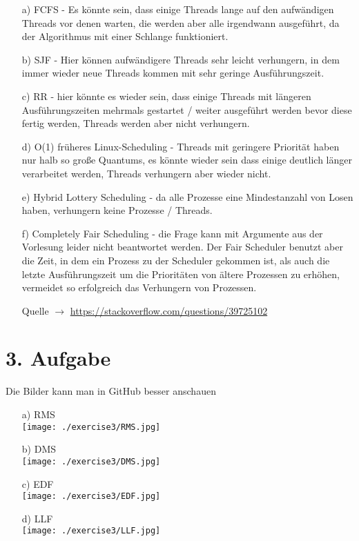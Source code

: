 \begin{enumerate}

\item[a)]
FCFS - Es könnte sein, dass einige Threads lange auf den aufwändigen Threads vor denen warten, die werden aber alle irgendwann ausgeführt, da der Algorithmus mit einer Schlange funktioniert.

\item[b)]
SJF - Hier können aufwändigere Threads sehr leicht verhungern, in dem immer wieder neue Threads kommen mit sehr geringe Ausführungszeit.

\item[c)]
RR - hier könnte es wieder sein, dass einige Threads mit längeren Ausführungszeiten mehrmals gestartet / weiter ausgeführt werden bevor diese fertig werden, Threads werden aber nicht verhungern.

\item[d)]
O(1) früheres Linux-Scheduling - Threads mit geringere Priorität haben nur halb so große Quantums, es könnte wieder sein dass einige deutlich länger verarbeitet werden, Threads verhungern aber wieder nicht.

\item[e)]
Hybrid Lottery Scheduling - da alle Prozesse eine Mindestanzahl von Losen haben, verhungern keine Prozesse / Threads.

\item[f)]
Completely Fair Scheduling - die Frage kann mit Argumente aus der Vorlesung leider nicht beantwortet werden. Der Fair Scheduler benutzt aber die Zeit, in dem ein Prozess zu der Scheduler gekommen ist, als auch die letzte Ausführungszeit um die Prioritäten von ältere Prozessen zu erhöhen, vermeidet so erfolgreich das Verhungern von Prozessen.

Quelle $\rightarrow$ \url{https://stackoverflow.com/questions/39725102}

\end{enumerate}

\section*{3. Aufgabe}

Die Bilder kann man in GitHub besser anschauen

\begin{enumerate}

\item[a)] RMS \\
\texttt{[image: ./exercise3/RMS.jpg]} \clearpage
\item[b)] DMS \\
\texttt{[image: ./exercise3/DMS.jpg]} \clearpage
\item[c)] EDF \\
\texttt{[image: ./exercise3/EDF.jpg]} \clearpage
\item[d)] LLF \\
\texttt{[image: ./exercise3/LLF.jpg]} 

\end{enumerate}

